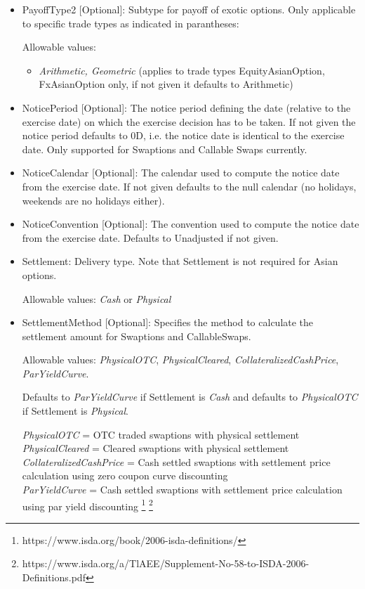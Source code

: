 \begin{itemize}
  Index CDS Options must have style  \emph{European}.

  Ascots must have style  \emph{American}.

\item PayoffType2 [Optional]: Subtype for payoff of exotic options. Only applicable to specific trade types as indicated in parantheses:

  Allowable values:
  \begin{itemize}
  \item \emph{Arithmetic, Geometric} (applies to trade types EquityAsianOption, FxAsianOption only, if not given it defaults to Arithmetic)
  \end{itemize}

\item NoticePeriod [Optional]: The notice period defining the date (relative to the exercise date) on which the exercise
  decision has to be taken. If not given the notice period defaults to 0D, i.e. the notice date is identical to the
  exercise date. Only supported for Swaptions and Callable Swaps currently.

\item NoticeCalendar [Optional]: The calendar used to compute the notice date from the exercise date. If not given
  defaults to the null calendar (no holidays, weekends are no holidays either).

\item NoticeConvention [Optional]: The convention used to compute the notice date from the exercise date. Defaults to
  Unadjusted if not given.

\item Settlement: Delivery type. Note that Settlement is not required for Asian options.

  Allowable values: \emph{Cash} or \emph{Physical}

\item SettlementMethod [Optional]: Specifies the method to calculate the settlement amount for Swaptions and CallableSwaps.

  Allowable values: \emph{PhysicalOTC}, \emph{PhysicalCleared}, \emph{CollateralizedCashPrice},\\ \emph{ParYieldCurve}.

  Defaults to \emph{ParYieldCurve} if Settlement is \emph{Cash} and defaults to \emph{PhysicalOTC} if Settlement is \emph{Physical}.

\emph{PhysicalOTC} = OTC traded swaptions with physical settlement\\
\emph{PhysicalCleared} = Cleared swaptions with physical settlement\\
\emph{CollateralizedCashPrice} = Cash settled swaptions with settlement price calculation using zero coupon curve discounting \\
\emph{ParYieldCurve}  = Cash settled swaptions with settlement price calculation using par yield discounting \footnote{https://www.isda.org/book/2006-isda-definitions/} \footnote{https://www.isda.org/a/TlAEE/Supplement-No-58-to-ISDA-2006-Definitions.pdf} \\


\end{itemize}
